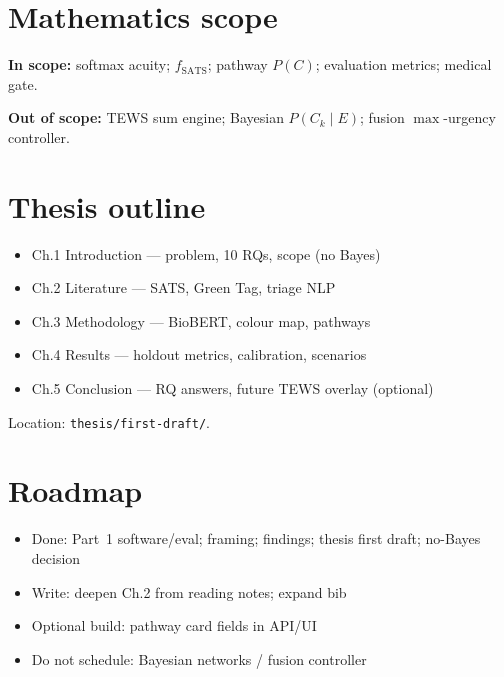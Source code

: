 \documentclass[11pt,a4paper]{article}
\begin{document}
\section{Mathematics scope}
\textbf{In scope:} softmax acuity; $f_{\mathrm{SATS}}$; pathway $P(C)$; evaluation metrics; medical gate.

\textbf{Out of scope:} TEWS sum engine; Bayesian $P(C_k\mid E)$; fusion $\max$-urgency controller.

\section{Thesis outline}
\begin{itemize}
  \item Ch.1 Introduction --- problem, 10 RQs, scope (no Bayes)
  \item Ch.2 Literature --- SATS, Green Tag, triage NLP
  \item Ch.3 Methodology --- BioBERT, colour map, pathways
  \item Ch.4 Results --- holdout metrics, calibration, scenarios
  \item Ch.5 Conclusion --- RQ answers, future TEWS overlay (optional)
\end{itemize}
Location: \texttt{thesis/first-draft/}.

\section{Roadmap}
\begin{itemize}
  \item Done: Part~1 software/eval; framing; findings; thesis first draft; no-Bayes decision
  \item Write: deepen Ch.2 from reading notes; expand bib
  \item Optional build: pathway card fields in API/UI
  \item Do not schedule: Bayesian networks / fusion controller
\end{itemize}
\end{document}
